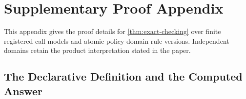\section{Supplementary Proof Appendix}
\label{app:proofs}

This appendix gives the proof details for \cref{thm:exact-checking} over finite registered call models and atomic policy-domain rule versions.
Independent domains retain the product interpretation stated in the paper.

\subsection{The Declarative Definition and the Computed Answer}
\label{app:spec-bridge}

